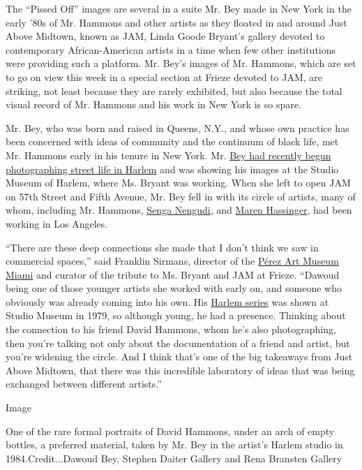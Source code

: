 The ``Pissed Off'' images are several in a suite Mr. Bey made in New
York in the early '80s of Mr. Hammons and other artists as they floated
in and around Just Above Midtown, known as JAM, Linda Goode Bryant's
gallery devoted to contemporary African-American artists in a time when
few other institutions were providing such a platform. Mr. Bey's images
of Mr. Hammons, which are set to go on view this week in a special
section at Frieze devoted to JAM, are striking, not least because they
are rarely exhibited, but also because the total visual record of Mr.
Hammons and his work in New York is so spare.

Mr. Bey, who was born and raised in Queens, N.Y., and whose own practice
has been concerned with ideas of community and the continuum of black
life, met Mr. Hammons early in his tenure in New York. Mr.
\href{https://www.studiomuseum.org/exhibition/dawoud-beys-harlem-usa}{Bey
had recently begun photographing street life in Harlem} and was showing
his images at the Studio Museum of Harlem, where Ms. Bryant was working.
When she left to open JAM on 57th Street and Fifth Avenue, Mr. Bey fell
in with its circle of artists, many of whom, including Mr. Hammons,
\href{http://sengasenga.com/}{Senga Nengudi}, and
\href{https://hammer.ucla.edu/now-dig-this/artists/maren-hassinger/}{Maren
Hassinger}, had been working in Los Angeles.

``There are these deep connections she made that I don't think we saw in
commercial spaces,'' said Franklin Sirmans, director of the
\href{https://www.nytimes.com/2015/09/04/arts/design/perez-art-museum-miami-names-franklin-sirmans-as-new-director.html}{Pérez
Art Museum Miami} and curator of the tribute to Ms. Bryant and JAM at
Frieze. ``Dawoud being one of those younger artists she worked with
early on, and someone who obviously was already coming into his own. His
\href{https://www.nytimes.com/2018/12/24/lens/dawoud-bey-seeing-deeply.html}{Harlem
series} was shown at Studio Museum in 1979, so although young, he had a
presence. Thinking about the connection to his friend David Hammons,
whom he's also photographing, then you're talking not only about the
documentation of a friend and artist, but you're widening the circle.
And I think that's one of the big takeaways from Just Above Midtown,
that there was this incredible laboratory of ideas that was being
exchanged between different artists.''

Image

One of the rare formal portraits of David Hammons, under an arch of
empty bottles, a preferred material, taken by Mr. Bey in the artist's
Harlem studio in 1984.Credit...Dawoud Bey, Stephen Daiter Gallery and
Rena Bransten Gallery

